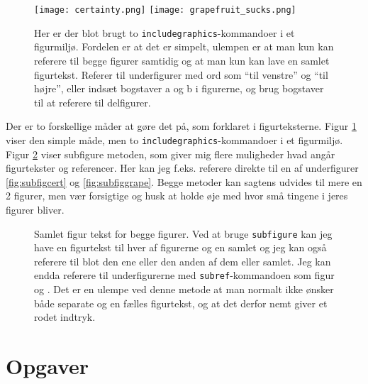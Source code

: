 \documentclass[a4paper,twoside]{article}
\begin{document}
\begin{figure}
\begin{centering}
\texttt{[image: certainty.png]}
\hspace{0.5cm}
\texttt{[image: grapefruit\_sucks.png]}
\par\end{centering}
\caption{\label{cap:2ien}Her er der blot brugt to
  \texttt{includegraphics}-kommandoer i et figurmiljø. Fordelen er at
  det er simpelt, ulempen er at man kun kan referere til begge figurer
  samtidig og at man kun kan lave en samlet figurtekst.  Referer til
  underfigurer med ord som "`til venstre"' og "`til højre"', eller
  indsæt bogstaver a og b i figurerne, og brug bogstaver til at
  referere til delfigurer.}
\end{figure}

Der er to forskellige måder at gøre det på, som forklaret i
figurteksterne. Figur \ref{cap:2ien} viser den simple måde, men to
\texttt{includegraphics}-kommandoer i et figurmiljø. Figur
\ref{fig:subfigure} viser subfigure metoden, som giver mig flere
muligheder hvad angår figurtekster og referencer. Her kan jeg
f.eks. referere direkte til en af underfigurer \ref{fig:subfigcert} og
\ref{fig:subfiggrape}. Begge metoder kan sagtens udvides til mere en 2
figurer, men vær forsigtige og husk at holde øje med hvor små tingene
i jeres figurer bliver.

\begin{figure}
\centering
{}
\label{fig:subfigure}
\caption{Samlet figur tekst for begge figurer. Ved at bruge
  \texttt{subfigure} kan jeg have en figurtekst til hver af figurerne
  og en samlet og jeg kan også referere til blot den ene eller den
  anden af dem eller samlet. Jeg kan endda referere til underfigurerne
  med \texttt{subref}-kommandoen som figur  og
  .  Det er en ulempe ved denne metode at man
  normalt ikke ønsker både separate og en fælles figurtekst, og at det
derfor nemt giver et rodet indtryk.}
\end{figure}

\section{Opgaver}
\subsection{}
\end{document}
